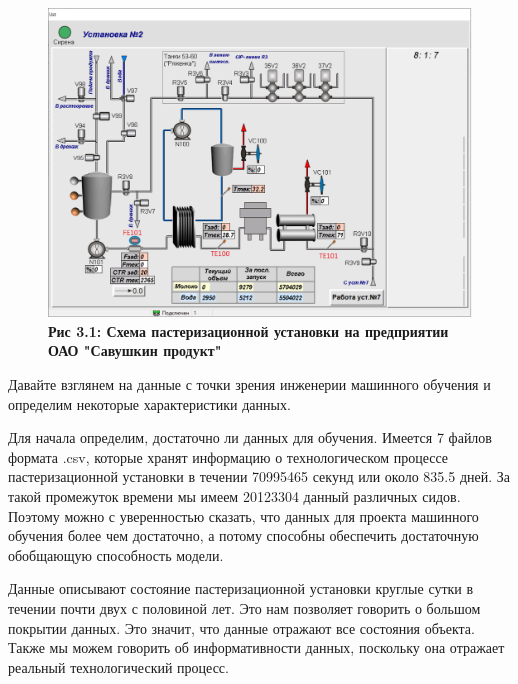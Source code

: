 {  \begin{figure}
    \centering
    \def\svgwidth{\textwidth}
    \includegraphics[width=\textwidth]{images/paster.png}
    \caption{\bfseries Рис 3.1: Схема пастеризационной установки на предприятии ОАО "Савушкин продукт"}
    \label{fig:NNBlackBox}
  \end{figure}

  \par \redline Давайте взглянем на данные с точки зрения инженерии машинного обучения и определим некоторые характеристики данных. 

  \par \redline Для начала определим, достаточно ли данных для обучения. Имеется 7 файлов формата .csv, которые хранят информацию о технологическом процессе пастеризационной установки в течении 70995465 секунд или около 835.5 дней. За такой промежуток времени мы имеем 20123304 данный различных сидов. Поэтому можно с уверенностью сказать, что данных для проекта машинного обучения более чем достаточно, а потому способны обеспечить достаточную обобщающую способность модели.

  \par \redline Данные описывают состояние пастеризационной установки круглые сутки в течении почти двух с половиной лет. Это нам позволяет говорить о большом покрытии данных. Это значит, что данные отражают все состояния объекта. Также мы можем говорить об информативности данных, поскольку она отражает реальный технологический процесс.

}
